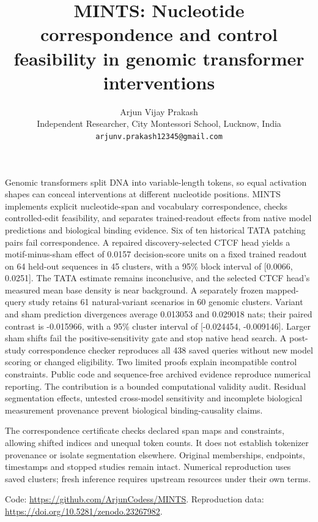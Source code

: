 \documentclass[10pt,letterpaper]{article}
\title{MINTS: Nucleotide correspondence and control feasibility in genomic transformer interventions}
\author{Arjun Vijay Prakash\\Independent Researcher, City Montessori School, Lucknow, India\\\texttt{arjunv.prakash12345@gmail.com}}\date{}
\begin{document}
\maketitle
Genomic transformers split DNA into variable-length tokens, so equal activation shapes can conceal interventions at different nucleotide positions. MINTS implements explicit nucleotide-span and vocabulary correspondence, checks controlled-edit feasibility, and separates trained-readout effects from native model predictions and biological binding evidence. Six of ten historical TATA patching pairs fail correspondence. A repaired discovery-selected CTCF head yields a motif-minus-sham effect of 0.0157 decision-score units on a fixed trained readout on 64 held-out sequences in 45 clusters, with a 95\% block interval of [0.0066, 0.0251]. The TATA estimate remains inconclusive, and the selected CTCF head's measured mean base density is near background. A separately frozen mapped-query study retains 61 natural-variant scenarios in 60 genomic clusters. Variant and sham prediction divergences average 0.013053 and 0.029018 nats; their paired contrast is -0.015966, with a 95\% cluster interval of [-0.024454, -0.009146]. Larger sham shifts fail the positive-sensitivity gate and stop native head search. A post-study correspondence checker reproduces all 438 saved queries without new model scoring or changed eligibility. Two limited proofs explain incompatible control constraints. Public code and sequence-free archived evidence reproduce numerical reporting. The contribution is a bounded computational validity audit. Residual segmentation effects, untested cross-model sensitivity and incomplete biological measurement provenance prevent biological binding-causality claims.

The correspondence certificate checks declared span maps and constraints, allowing shifted indices and unequal token counts. It does not establish tokenizer provenance or isolate segmentation elsewhere. Original memberships, endpoints, timestamps and stopped studies remain intact. Numerical reproduction uses saved clusters; fresh inference requires upstream resources under their own terms.

Code: \url{https://github.com/ArjunCodess/MINTS}. Reproduction data: \url{https://doi.org/10.5281/zenodo.23267982}.
\end{document}
